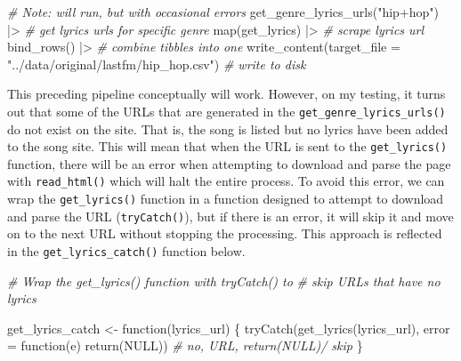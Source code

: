 \documentclass[
  letterpaper,
]{latex/krantz}
\newenvironment{Shaded}{\begin{snugshade}}{\end{snugshade}}
\newcommand{\AttributeTok}[1]{\textcolor[rgb]{0.00,0.00,0.00}{#1}}
\newcommand{\CommentTok}[1]{\textcolor[rgb]{0.00,0.00,0.00}{\textit{#1}}}
\newcommand{\ConstantTok}[1]{\textcolor[rgb]{0.00,0.00,0.00}{#1}}
\newcommand{\ControlFlowTok}[1]{\textcolor[rgb]{0.00,0.00,0.00}{#1}}
\newcommand{\FunctionTok}[1]{\textcolor[rgb]{0.00,0.00,0.00}{#1}}
\newcommand{\NormalTok}[1]{\textcolor[rgb]{0.00,0.00,0.00}{#1}}
\newcommand{\OtherTok}[1]{\textcolor[rgb]{0.00,0.00,0.00}{#1}}
\newcommand{\SpecialCharTok}[1]{\textcolor[rgb]{0.00,0.00,0.00}{#1}}
\newcommand{\StringTok}[1]{\textcolor[rgb]{0.00,0.00,0.00}{#1}}
\begin{document}
\begin{Shaded}
\begin{Highlighting}[]
\CommentTok{\# Note: will run, but with occasional errors}
\FunctionTok{get\_genre\_lyrics\_urls}\NormalTok{(}\StringTok{"hip+hop"}\NormalTok{) }\SpecialCharTok{|\textgreater{}} \CommentTok{\# get lyrics urls for specific genre}
  \FunctionTok{map}\NormalTok{(get\_lyrics) }\SpecialCharTok{|\textgreater{}}  \CommentTok{\# scrape lyrics url}
  \FunctionTok{bind\_rows}\NormalTok{() }\SpecialCharTok{|\textgreater{}} \CommentTok{\# combine tibbles into one}
  \FunctionTok{write\_content}\NormalTok{(}\AttributeTok{target\_file =} \StringTok{"../data/original/lastfm/hip\_hop.csv"}\NormalTok{) }\CommentTok{\# write to disk}
\end{Highlighting}
\end{Shaded}

This preceding pipeline conceptually will work. However, on my testing,
it turns out that some of the URLs that are generated in the
\texttt{get\_genre\_lyrics\_urls()} do not exist on the site. That is,
the song is listed but no lyrics have been added to the song site. This
will mean that when the URL is sent to the \texttt{get\_lyrics()}
function, there will be an error when attempting to download and parse
the page with \texttt{read\_html()} which will halt the entire process.
To avoid this error, we can wrap the \texttt{get\_lyrics()} function in
a function designed to attempt to download and parse the URL
(\texttt{tryCatch()}), but if there is an error, it will skip it and
move on to the next URL without stopping the processing. This approach
is reflected in the \texttt{get\_lyrics\_catch()} function below.

\begin{Shaded}
\begin{Highlighting}[]
\CommentTok{\# Wrap the \textasciigrave{}get\_lyrics()\textasciigrave{} function with \textasciigrave{}tryCatch()\textasciigrave{} to }
\CommentTok{\# skip URLs that have no lyrics}

\NormalTok{get\_lyrics\_catch }\OtherTok{\textless{}{-}} \ControlFlowTok{function}\NormalTok{(lyrics\_url) \{}
  \FunctionTok{tryCatch}\NormalTok{(}\FunctionTok{get\_lyrics}\NormalTok{(lyrics\_url), }
           \AttributeTok{error =} \ControlFlowTok{function}\NormalTok{(e) }\FunctionTok{return}\NormalTok{(}\ConstantTok{NULL}\NormalTok{)) }\CommentTok{\# no, URL, return(NULL)/ skip}
\NormalTok{\}}
\end{Highlighting}
\end{Shaded}
\end{document}
